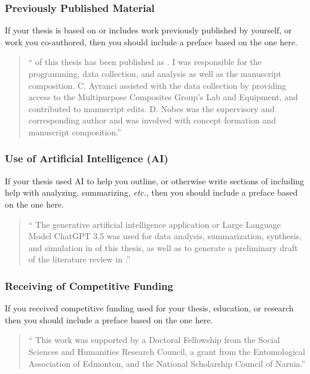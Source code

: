 			\subsubsection{Previously Published Material}\label{preface:PPW}
				If your thesis is based on or includes work previously published by yourself, or work you co-authored, then you should include a preface based on the one here.

				\begin{quote}
					\enquote{%
						 of this thesis has been published as . 
						I was responsible for the programming, data collection, and analysis as well as the manuscript composition. C. Ayranci assisted with the data collection by providing access to the Multipurpose Composites Group's Lab and Equipment, and contributed to manuscript edits. D. Nobes was the supervisory and corresponding author and was involved with concept formation and manuscript composition.}
				\end{quote}

			\subsubsection{Use of Artificial Intelligence (AI)}\label{preface:AI}
				If your thesis used AI to help you outline, or otherwise write sections of including help with analyzing, summarizing, \textit{etc.}, then you should include a preface based on the one here.

				\begin{quote}
					\enquote{%
						The generative artificial intelligence application or Large Language Model ChatGPT 3.5 was used for data analysis, summarization, synthesis, and simulation in  of this thesis, as well as to generate a preliminary draft of the literature review in .}
				\end{quote}
				
			\subsubsection{Receiving of Competitive Funding}\label{preface:CF}
				If you received competitive funding used for your thesis, education, or research then you should include a preface based on the one here.

				\begin{quote}
					\enquote{%
						This work was supported by a Doctoral Fellowship from the Social Sciences and Humanities Research Council, a grant from the Entomological Association of Edmonton, and the National Scholarship Council of Narnia.}
				\end{quote}
				
